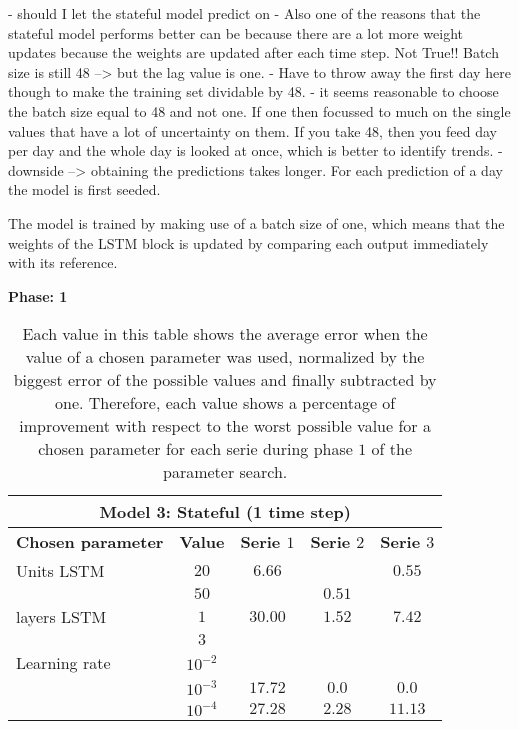 - should I let the stateful model predict on 
- Also one of the reasons that the stateful model performs better can be because there are a lot more weight updates because the weights are updated after each time step. Not True!! Batch size is still 48 --> but the lag value is one.
- Have to throw away the first day here though to make the training set dividable by 48. 
- it seems reasonable to choose the batch size equal to 48 and not one. If one then focussed to much on the single values that have a lot of uncertainty on them. If you take 48, then you feed day per day and the whole day is looked at once, which is better to identify trends. 
- downside --> obtaining the predictions takes longer. For each prediction of a day the model is first seeded. 

The model is trained by making use of a batch size of one, which means that the weights of the LSTM block is updated by comparing each output immediately with its reference. 

\textbf{Phase: 1}\\

\begin{table}[ht]
	\centering
	\begin{tabular}{@{}l||c|ccc@{}} \toprule
		\multicolumn{5}{c}{Model 3: Stateful (1 time step)}\\\midrule\midrule
		\textbf{Chosen parameter}	& \textbf{Value} & \textbf{Serie $ 1 $} & \textbf{Serie $ 2 $} & \textbf{Serie $ 3 $}\\\midrule
		Units LSTM & $ 20 $ & $6.66 $		&  & $0.55 $\\
		& $ 50 $ & 		  		&	$ 0.51 $	   & 		\\\hline
		layers LSTM & $ 1 $ & $30.00 $		&	$ 1.52 $	   & 	$7.42$	\\
		& $ 3 $ & 	      		& 			 & \\\hline
		Learning rate & $ 10^{-2} $ &       &		   & 		\\
		& $  10^{-3} $ &$17.72 $&$0.0$  & $0.0$\\
		& $  10^{-4} $ &$27.28 $&$ 2.28$    & $11.13$\\\bottomrule
		
	\end{tabular}
	\caption{Each value in this table shows the average error when the value of a chosen parameter was used, normalized by the biggest error of the possible values and finally subtracted by one. Therefore, each value shows a percentage of improvement with respect to the worst possible value for a chosen parameter for each serie during phase $ 1 $ of the parameter search.}
	\label{tab:relative_performance_parameters_phase_one_model_three}
\end{table}

